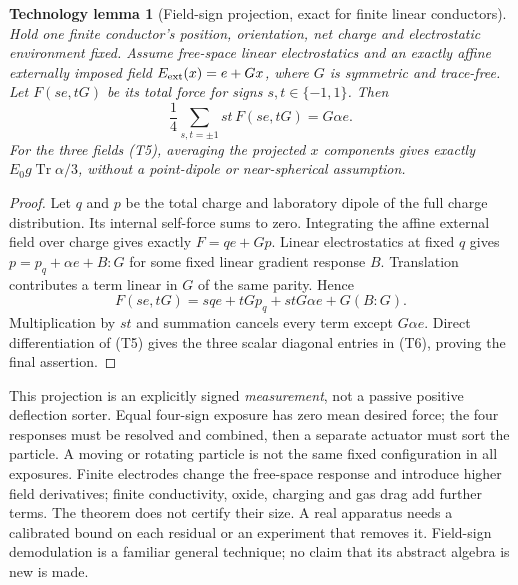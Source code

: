 \documentclass[11pt]{article}
\newcommand{\Tr}{\operatorname{Tr}}
\newtheorem{techtheorem}{Technology lemma}
\begin{document}
\begin{techtheorem}[Field-sign projection, exact for finite linear conductors]\label{thm:fieldprojection}
Hold one finite conductor's position, orientation, net charge and electrostatic environment fixed. Assume free-space linear electrostatics and an exactly affine externally imposed field $E_{\rm ext}(x)=e+Gx$, where $G$ is symmetric and trace-free. Let $F(se,tG)$ be its total force for signs $s,t\in\{-1,1\}$. Then
\[
 \frac14\sum_{s,t=\pm1}st\,F(se,tG)=G\alpha e.
 \tag{T9}
\]
For the three fields (T5), averaging the projected $x$ components gives exactly $E_0g\Tr\alpha/3$, without a point-dipole or near-spherical assumption.
\end{techtheorem}
\begin{proof}
Let $q$ and $p$ be the total charge and laboratory dipole of the full charge distribution. Its internal self-force sums to zero. Integrating the affine external field over charge gives exactly $F=qe+Gp$. Linear electrostatics at fixed $q$ gives $p=p_q+\alpha e+B:G$ for some fixed linear gradient response $B$. Translation contributes a term linear in $G$ of the same parity. Hence
\[
 F(se,tG)=sqe+tGp_q+stG\alpha e+G(B:G).
\]
Multiplication by $st$ and summation cancels every term except $G\alpha e$. Direct differentiation of (T5) gives the three scalar diagonal entries in (T6), proving the final assertion.
\end{proof}

This projection is an explicitly signed \emph{measurement}, not a passive positive deflection sorter. Equal four-sign exposure has zero mean desired force; the four responses must be resolved and combined, then a separate actuator must sort the particle. A moving or rotating particle is not the same fixed configuration in all exposures. Finite electrodes change the free-space response and introduce higher field derivatives; finite conductivity, oxide, charging and gas drag add further terms. The theorem does not certify their size. A real apparatus needs a calibrated bound on each residual or an experiment that removes it. Field-sign demodulation is a familiar general technique; no claim that its abstract algebra is new is made.
\end{document}
